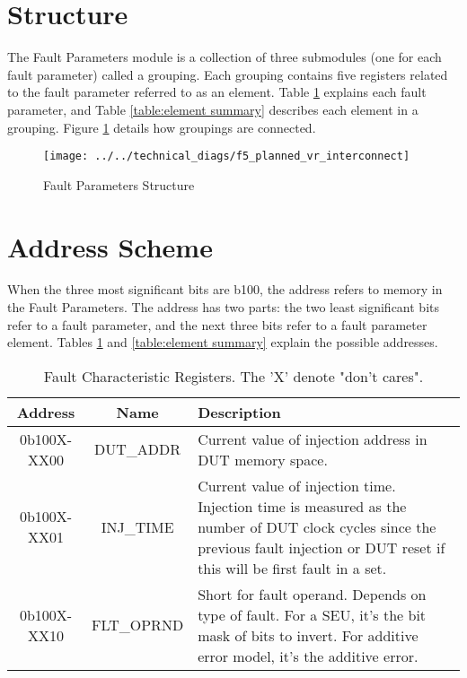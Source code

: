 \documentclass[]{report}
\begin{document}
\clearpage
\section{Structure}

The Fault Parameters module is a collection of three submodules (one for each fault parameter) called a grouping. Each grouping contains five registers related to the fault parameter referred to as an element. Table \ref{table:fault char regs} explains each fault parameter, and Table \ref{table:element summary} describes each element in a grouping. Figure \ref{fig:fp structure} details how groupings are connected.
\begin{figure}[h]
	\centering
	\texttt{[image: ../../technical\_diags/f5\_planned\_vr\_interconnect]}
	\caption{Fault Parameters Structure}
	\label{fig:fp structure}
\end{figure}

\clearpage
\section{Address Scheme}
\label{sec fp addr scheme}
When the three most significant bits are b100, the address refers to memory in the Fault Parameters. The address has two parts: the two least significant bits refer to a fault parameter, and the next three bits refer to a fault parameter element. Tables \ref{table:fault char regs} and \ref{table:element summary} explain the possible addresses.

\begin{table}[h]
	\centering
	\caption{Fault Characteristic Registers. The 'X' denote "don't cares".}
	\begin{tabular}{|c|c|p{9cm}|}
		\hline 
		Address & Name & Description \\ 
		\hline 
		0b100X-XX00 & DUT\_ADDR & Current value of injection address in DUT memory space. \\ 
		\hline 
		0b100X-XX01 & INJ\_TIME & Current value of injection time. Injection time is measured as the number of DUT clock cycles since the previous fault injection or DUT reset if this will be first fault in a set.  \\ 
		\hline 
		0b100X-XX10 & FLT\_OPRND & Short for fault operand. Depends on type of fault. For a SEU, it's the bit mask of bits to invert. For additive error model, it's the additive error. \\ 
		\hline 
	\end{tabular} 
	\label{table:fault char regs}
\end{table}
\end{document}
